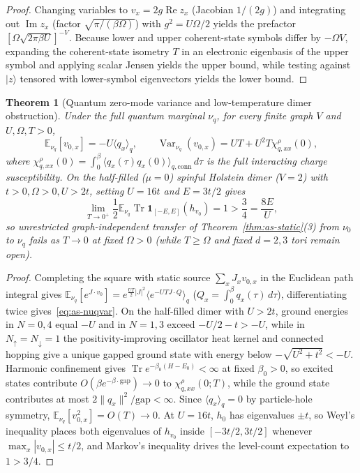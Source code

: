 \documentclass[11pt]{article}
\newtheorem{theorem}{Theorem}[section]
\theoremstyle{definition}
\theoremstyle{remark}
\DeclareMathOperator{\Tr}{Tr}
\DeclareMathOperator{\Var}{Var}
\newcommand{\E}{\mathbb{E}}
\begin{document}
\begin{proof}
Changing variables to $v_x = 2g\operatorname{Re} z_x$ (Jacobian $1/(2g)$) and
integrating out $\operatorname{Im} z_x$ (factor $\sqrt{\pi/(\beta\Omega)}$)
with $g^2 = U\Omega/2$ yields the prefactor $[\Omega\sqrt{2\pi\beta U}]^{-V}$.
Because lower and upper coherent-state symbols differ by $-\Omega V$, expanding
the coherent-state isometry $T$ in an electronic eigenbasis of the upper
symbol and applying scalar Jensen yields the upper bound, while testing against
$|z\rangle$ tensored with lower-symbol eigenvectors yields the lower bound.
\end{proof}

\begin{theorem}[Quantum zero-mode variance and low-temperature dimer obstruction]
\label{thm:as-dimer}
Under the full quantum marginal $\nu_q$, for every finite graph $V$ and
$U, \Omega, T > 0$,
\begin{equation}
\label{eq:as-nuqvar}
\E_{\nu_q}[v_{0,x}] = -U \langle q_x \rangle_q,
\qquad
\Var_{\nu_q}(v_{0,x}) = UT + U^2 T \chi_{q,xx}^\rho(0),
\end{equation}
where $\chi_{q,xx}^\rho(0) = \int_0^\beta \langle q_x(\tau) q_x(0)\rangle_{q,\mathrm{conn}}\,d\tau$
is the full interacting charge susceptibility. On the half-filled ($\mu=0$)
spinful Holstein dimer ($V=2$) with $t > 0, \Omega > 0, U > 2t$, setting
$U = 16t$ and $E = 3t/2$ gives
\[
\lim_{T \to 0^+} \frac{1}{2} \E_{\nu_q} \Tr \mathbf{1}_{[-E,E]}(h_{v_0}) = 1
> \frac{3}{4} = \frac{8E}{U},
\]
so unrestricted graph-independent transfer of Theorem~\ref{thm:as-static}(3)
from $\nu_0$ to $\nu_q$ fails as $T \to 0$ at fixed $\Omega > 0$ (while $T \ge \Omega$
and fixed $d=2,3$ tori remain open).
\end{theorem}

\begin{proof}
Completing the square with static source $\sum_x J_x v_{0,x}$ in the Euclidean
path integral gives $\E_{\nu_q}[e^{J\cdot v_0}] = e^{\frac{UT}{2}|J|^2}\langle e^{-UT J\cdot Q}\rangle_q$
($Q_x = \int_0^\beta q_x(\tau)\,d\tau$), differentiating twice gives~\eqref{eq:as-nuqvar}.
On the half-filled dimer with $U > 2t$, ground energies in $N=0,4$ equal $-U$
and in $N=1,3$ exceed $-U/2-t > -U$, while in $N_\uparrow = N_\downarrow = 1$
the positivity-improving oscillator heat kernel and connected hopping give a
unique gapped ground state with energy below $-\sqrt{U^2 + t^2} < -U$.
Harmonic confinement gives $\Tr e^{-\beta_0(H-E_0)} < \infty$ at fixed $\beta_0 > 0$,
so excited states contribute $O(\beta e^{-\beta\cdot\mathrm{gap}}) \to 0$ to
$\chi_{q,xx}^\rho(0;T)$, while the ground state contributes at most
$2\|q_x\|^2/\mathrm{gap} < \infty$. Since $\langle q_x \rangle_q = 0$ by
particle-hole symmetry, $\E_{\nu_q}[v_{0,x}^2] = O(T) \to 0$. At $U=16t$,
$h_0$ has eigenvalues $\pm t$, so Weyl's inequality places both eigenvalues of
$h_{v_0}$ inside $[-3t/2, 3t/2]$ whenever $\max_x |v_{0,x}| \le t/2$, and
Markov's inequality drives the level-count expectation to $1 > 3/4$.
\end{proof}
\end{document}
